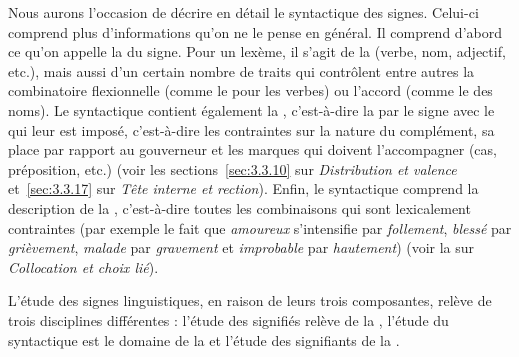 Nous aurons l’occasion de décrire en détail le syntactique des signes. Celui-ci comprend plus d’informations qu’on ne le pense en général. Il comprend d’abord ce qu’on appelle la  du signe. Pour un lexème, il s’agit de la  (verbe, nom, adjectif, etc.), mais aussi d’un certain nombre de traits qui contrôlent entre autres la combinatoire flexionnelle (comme le  pour les verbes) ou l’accord (comme le  des noms). Le syntactique contient également la , c’est-à-dire la  par le signe avec le  qui leur est imposé, c’est-à-dire les contraintes sur la nature du complément, sa place par rapport au gouverneur et les marques qui doivent l’accompagner (cas, préposition, etc.) (voir les sections~\ref{sec:3.3.10} sur \textit{Distribution et valence} et~\ref{sec:3.3.17} sur \textit{Tête interne et rection}). Enfin, le syntactique comprend la description de la , c’est-à-dire toutes les combinaisons qui sont lexicalement contraintes (par exemple le fait que \textit{amoureux} s’intensifie par \textit{follement}, \textit{blessé} par \textit{grièvement}, \textit{malade} par \textit{gravement} et \textit{improbable} par \textit{hautement}) (voir la  sur \textit{Collocation et choix lié}).

L’étude des signes linguistiques, en raison de leurs trois composantes, relève de trois disciplines différentes : l’étude des signifiés relève de la , l’étude du syntactique est le domaine de la  et l’étude des signifiants de la .

